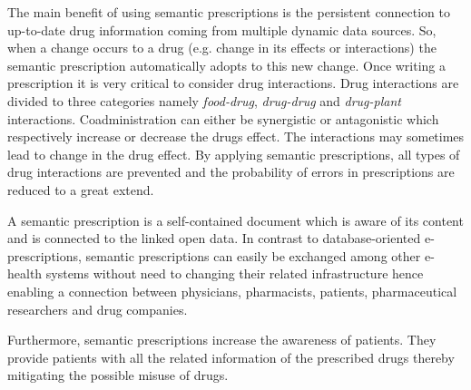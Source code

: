 \documentclass[10pt, conference, compsocconf]{IEEEtran}
\begin{document}
The main benefit of using semantic prescriptions is the persistent connection to up-to-date drug information coming from multiple dynamic data sources.
So, when a change occurs to a drug (e.g. change in its effects or interactions) the semantic prescription automatically adopts to this new change.
Once writing a prescription it is very critical to consider drug interactions.
Drug interactions are divided to three categories namely \emph{food-drug}, \emph{drug-drug} and \emph{drug-plant} interactions.
Coadministration can either be synergistic or antagonistic which respectively increase or decrease the drugs effect.
The interactions may sometimes lead to change in the drug effect.
By applying semantic prescriptions, all types of drug interactions are prevented and the probability of errors in prescriptions are reduced to a great extend.

A semantic prescription is a self-contained document which is aware of its content and is connected to the linked open data.
In contrast to database-oriented e-prescriptions, semantic prescriptions can easily be exchanged among other e-health systems without need to changing their related infrastructure hence enabling a connection between physicians, pharmacists, patients, pharmaceutical researchers and drug companies.

Furthermore, semantic prescriptions increase the awareness of patients.
They provide patients with all the related information of the prescribed drugs thereby mitigating the possible misuse of drugs.

\end{document}
